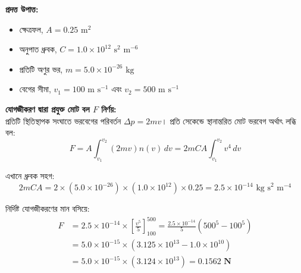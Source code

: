 \documentclass[12pt, a4paper]{article}
\begin{document}
\begin{tcolorbox}[solutionbox={সমাধান (Solution)}]
    \noindent
    \textbf{প্রদত্ত উপাত্ত:}
    \begin{itemize}[leftmargin=1.5em, itemsep=0.2em]
        \item ক্ষেত্রফল, $A = 0.25\text{ m}^2$
        \item অনুপাত ধ্রুবক, $C = 1.0 \times 10^{12}\text{ s}^2\text{ m}^{-6}$
        \item প্রতিটি অণুর ভর, $m = 5.0 \times 10^{-26}\text{ kg}$
        \item বেগের সীমা, $v_1 = 100\text{ m s}^{-1}$ এবং $v_2 = 500\text{ m s}^{-1}$
    \end{itemize}

    \vspace{0.6em}
    \noindent\textbf{যোগজীকরণ দ্বারা প্রযুক্ত মোট বল $F$ নির্ণয়:} \\
    প্রতিটি স্থিতিস্থাপক সংঘাতে ভরবেগের পরিবর্তন $\Delta p = 2mv$।
    প্রতি সেকেন্ডে স্থানান্তরিত মোট ভরবেগ অর্থাৎ লব্ধি বল:
    \[ F = A \int_{v_1}^{v_2} (2 m v) n(v) \, dv = 2 m C A \int_{v_1}^{v_2} v^4 \, dv \]
    
    এখানে ধ্রুবক সহগ:
    \[ 2 m C A = 2 \times (5.0 \times 10^{-26}) \times (1.0 \times 10^{12}) \times 0.25 = 2.5 \times 10^{-14}\text{ kg s}^2\text{ m}^{-4} \]
    
    নির্দিষ্ট যোগজীকরণের মান বসিয়ে:
    \begin{align*}
        F &= 2.5 \times 10^{-14} \times \left[ \frac{v^5}{5} \right]_{100}^{500} = \frac{2.5 \times 10^{-14}}{5} \left( 500^5 - 100^5 \right) \\
        &= 5.0 \times 10^{-15} \times (3.125 \times 10^{13} - 1.0 \times 10^{10}) \\
        &= 5.0 \times 10^{-15} \times (3.124 \times 10^{13}) = \mathbf{0.1562\text{ N}}
    \end{align*}
\end{tcolorbox}
\end{document}
